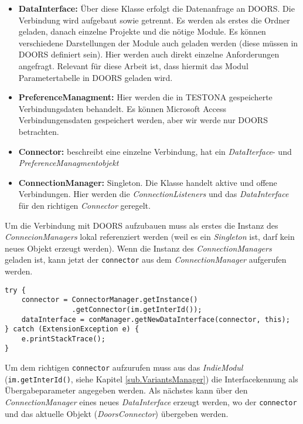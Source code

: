 \begin{itemize}
\item \textbf{DataInterface: }Über diese Klasse erfolgt die Datenanfrage an DOORS. Die Verbindung wird aufgebaut sowie getrennt. Es werden als erstes die Ordner geladen, danach einzelne Projekte und die nötige Module. Es können verschiedene Darstellungen der Module auch geladen werden (diese müssen in DOORS definiert sein). Hier werden auch direkt einzelne Anforderungen angefragt. Relevant für diese Arbeit ist, dass hiermit das Modul Parametertabelle in DOORS geladen wird.

\item \textbf{PreferenceManagment: } Hier werden die in TESTONA gespeicherte Verbindungsdaten behandelt. Es können Microsoft Access Verbindungensdaten gespeichert werden, aber wir werde nur DOORS betrachten.

\item \textbf{Connector: }beschreibt eine einzelne Verbindung, hat ein \textit{DataIterface}- und \textit{PreferenceManagmentobjekt}

\item \textbf{ConnectionManager: }Singleton. Die Klasse handelt aktive und offene Verbindungen. Hier werden die \textit{ConnectionListeners} und das \textit{DataInterface} für den richtigen \textit{Connector} geregelt.

\end{itemize}


Um die Verbindung mit DOORS aufzubauen muss als erstes die Instanz des \textit{ConnecionManagers} lokal referenziert werden (weil es ein \textit{Singleton} ist, darf kein neues Objekt erzeugt werden). Wenn die Instanz des \textit{ConnectionManagers} geladen ist, kann jetzt der \texttt{connector} aus dem \textit{ConnectionManager} aufgerufen werden.

\begin{lstlisting}[caption={Verbindungsaufbau}, captionpos=b]
try {
	connector = ConnectorManager.getInstance()
				.getConnector(im.getInterId());
	dataInterface = conManager.getNewDataInterface(connector, this);
} catch (ExtensionException e) {
	e.printStackTrace();
}
\end{lstlisting}

 Um dem richtigen \texttt{connector} aufzurufen muss aus das \textit{IndieModul} (\texttt{im.getInterId()}, siehe Kapitel \ref{sub.VariantsManager}) die Interfacekennung als Übergabeparameter angegeben werden. Als nächstes kann über den \textit{ConnectionManager} eines neues \textit{DataInterface} erzeugt werden, wo der \texttt{connector} und das aktuelle Objekt (\textit{DoorsConnector}) übergeben werden.\\
 
